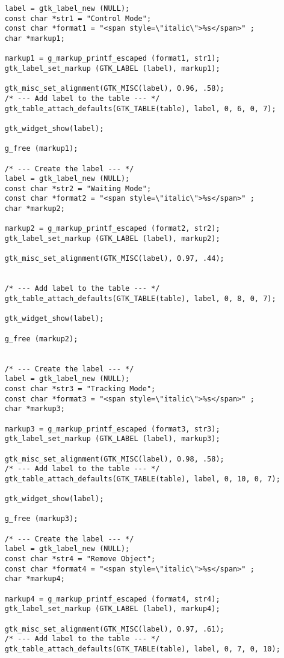 \begin{lstlisting}
	label = gtk_label_new (NULL);
	const char *str1 = "Control Mode";
	const char *format1 = "<span style=\"italic\">%s</span>" ;
	char *markup1;

	markup1 = g_markup_printf_escaped (format1, str1);
	gtk_label_set_markup (GTK_LABEL (label), markup1);

	gtk_misc_set_alignment(GTK_MISC(label), 0.96, .58);
	/* --- Add label to the table --- */
	gtk_table_attach_defaults(GTK_TABLE(table), label, 0, 6, 0, 7);

	gtk_widget_show(label);

	g_free (markup1);

	/* --- Create the label --- */
	label = gtk_label_new (NULL);
	const char *str2 = "Waiting Mode";
	const char *format2 = "<span style=\"italic\">%s</span>" ;
	char *markup2;

	markup2 = g_markup_printf_escaped (format2, str2);
	gtk_label_set_markup (GTK_LABEL (label), markup2);

	gtk_misc_set_alignment(GTK_MISC(label), 0.97, .44);


	/* --- Add label to the table --- */
	gtk_table_attach_defaults(GTK_TABLE(table), label, 0, 8, 0, 7);

	gtk_widget_show(label);

	g_free (markup2);


	/* --- Create the label --- */
	label = gtk_label_new (NULL);
	const char *str3 = "Tracking Mode";
	const char *format3 = "<span style=\"italic\">%s</span>" ;
	char *markup3;

	markup3 = g_markup_printf_escaped (format3, str3);
	gtk_label_set_markup (GTK_LABEL (label), markup3);

	gtk_misc_set_alignment(GTK_MISC(label), 0.98, .58);
	/* --- Add label to the table --- */
	gtk_table_attach_defaults(GTK_TABLE(table), label, 0, 10, 0, 7);

	gtk_widget_show(label);

	g_free (markup3);

	/* --- Create the label --- */
	label = gtk_label_new (NULL);
	const char *str4 = "Remove Object";
	const char *format4 = "<span style=\"italic\">%s</span>" ;
	char *markup4;

	markup4 = g_markup_printf_escaped (format4, str4);
	gtk_label_set_markup (GTK_LABEL (label), markup4);

	gtk_misc_set_alignment(GTK_MISC(label), 0.97, .61);
	/* --- Add label to the table --- */
	gtk_table_attach_defaults(GTK_TABLE(table), label, 0, 7, 0, 10);


\end{lstlisting}
